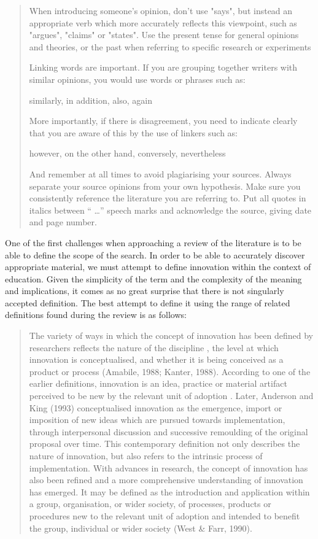 \begin{quote}
When introducing someone's opinion, don't use "says", but instead an appropriate verb which more accurately reflects this viewpoint, such as "argues", "claims" or "states". Use the present tense for general opinions and theories, or the past when referring to specific research or experiments

Linking words are important. If you are grouping together writers with similar opinions, you would use words or phrases such as:

similarly, in addition, also, again

More importantly, if there is disagreement, you need to indicate clearly that you are aware of this by the use of linkers such as:

however, on the other hand, conversely, nevertheless


And remember at all times to avoid plagiarising your sources. Always separate your source opinions from your own hypothesis. Make sure you consistently reference the literature you are referring to. Put all quotes in italics between “ …” speech marks and acknowledge the source, giving date and page number.

\end{quote}

One of the first challenges when approaching a review of the literature is to be able to define the scope of the search. In order to be able to accurately discover appropriate material, we must attempt to define innovation within the context of education. Given the simplicity of the term and the complexity of the meaning and implications, it comes as no great surprise that there is not singularly accepted definition. The best attempt to define it using the range of related definitions found during the review is as follows:

\begin{quote}
The variety of ways in which the concept of innovation has been defined by researchers reflects the nature of the discipline \cite{Gopalakrishnan_1994}, the level at which innovation is conceptualised, and whether it is being conceived as a product or process (Amabile, 1988; Kanter, 1988). According to one of the earlier definitions, innovation is an idea, practice or material artifact perceived to be new by the relevant unit of adoption \cite{Allen_1975}. Later, Anderson and King (1993) conceptualised innovation as the emergence, import or imposition of new ideas which are pursued towards implementation, through interpersonal discussion and successive remoulding of the original proposal over time. This contemporary definition not only describes the nature of innovation, but also refers to the intrinsic process of implementation. With advances in research, the concept of innovation has also been refined and a more comprehensive understanding of innovation has emerged. It may be defined as the introduction and application within a group, organisation, or wider society, of processes, products or procedures new to the relevant unit of adoption and intended to benefit the group, individual or wider society (West & Farr, 1990).
\end{quote}  \cite{Sharma_2005}

